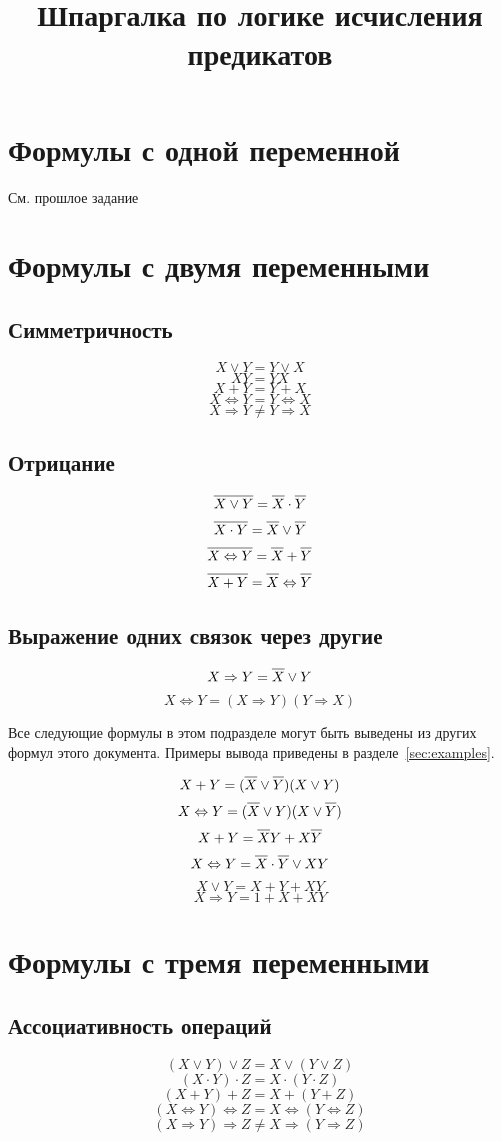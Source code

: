 \documentclass{article}
\title{Шпаргалка по логике исчисления предикатов}
\author{}
\date{}
\numberwithin{equation}{subsection}
\renewcommand{\[}{\begin{equation}}
\renewcommand{\]}{\end{equation}}
\newcommand{\NE}[1]{\overline{\vphantom{|} #1}}
\begin{document}
\section{Формулы с одной переменной}

См. прошлое задание

\section{Формулы с двумя переменными}

\subsection{Симметричность}
\[X \vee Y = Y \vee X\]
\[XY = YX\]
\[X + Y = Y + X\]
\[X \Leftrightarrow Y = Y \Leftrightarrow X\]
\[X \Rightarrow Y \ne Y \Rightarrow X\]

\subsection{Отрицание}
\[\NE{X\vee Y} = \NE{X}\cdot\NE{Y}\]
\[\NE{X\cdot Y} = \NE{X}\vee\NE{Y}\]
\[\NE{X\Leftrightarrow Y} = \NE{X}+\NE{Y}\]
\[\NE{X + Y} = \NE{X}\Leftrightarrow\NE{Y}\]

\subsection{Выражение одних связок через другие}

\[X\Rightarrow Y = \NE{X} \vee Y \]
\[X\Leftrightarrow Y = (X\Rightarrow Y)(Y\Rightarrow X)\]

Все следующие формулы в этом подразделе могут быть выведены из других формул этого документа. Примеры вывода приведены в разделе~\ref{sec:examples}.

\[X + Y = (\NE{X} \vee \NE{Y})(X \vee Y)\]
\[X \Leftrightarrow Y = (\NE{X} \vee Y)(X \vee \NE{Y})\]
\[X + Y = \NE{X}Y + X\NE{Y}\]
\[X \Leftrightarrow Y = \NE{X}\cdot\NE{Y} \vee XY\]
\[X \vee Y = X + Y + XY\]
\[X \Rightarrow Y = 1 + X + XY\]

\section{Формулы с тремя переменными}
\subsection{Ассоциативность операций}
\[(X \vee Y) \vee Z = X \vee (Y \vee Z)\]
\[(X \cdot Y) \cdot Z = X \cdot (Y \cdot Z)\]
\[(X + Y) + Z = X + (Y + Z)\]
\[(X \Leftrightarrow Y) \Leftrightarrow Z = X \Leftrightarrow (Y \Leftrightarrow Z)\]
\[(X \Rightarrow Y) \Rightarrow Z \ne X \Rightarrow (Y \Rightarrow Z)\]
\end{document}
